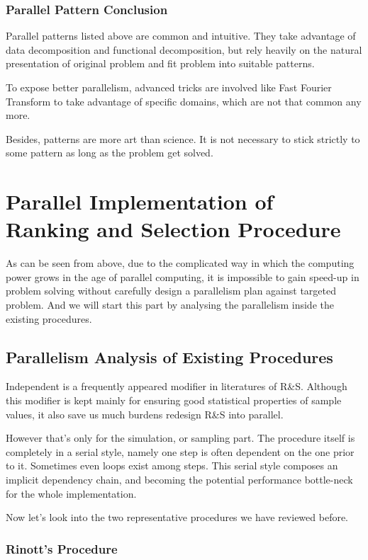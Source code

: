 \documentclass[12pt,a4]{report}
\begin{document}
\subsection{Parallel Pattern Conclusion}

Parallel patterns listed above are common and intuitive. They take advantage of data decomposition and functional decomposition, but rely heavily on the natural presentation of original problem and fit problem into suitable patterns.

To expose better parallelism, advanced tricks are involved like Fast Fourier Transform to take advantage of specific domains, which are not that common any more.

Besides, patterns are more art than science. It is not necessary to stick strictly to some pattern as long as the problem get solved.

\chapter{Parallel Implementation of Ranking and Selection Procedure}

As can be seen from above, due to the complicated way in which the computing power grows in the age of parallel computing, it is impossible to gain speed-up in problem solving without carefully design a parallelism plan against targeted problem. And we will start this part by analysing the parallelism inside the existing procedures.

\section{Parallelism Analysis of Existing Procedures}

Independent is a frequently appeared modifier in literatures of R\&S. Although this modifier is kept mainly for ensuring good statistical properties of sample values, it also save us much burdens redesign R\&S into parallel.

However that's only for the simulation, or sampling part. The procedure itself is completely in a serial style, namely one step is often dependent on the one prior to it. Sometimes even loops exist among steps. This serial style composes an implicit dependency chain, and becoming the potential performance bottle-neck for the whole implementation.

Now let's look into the two representative procedures we have reviewed before.

\subsection{Rinott's Procedure}
\end{document}
